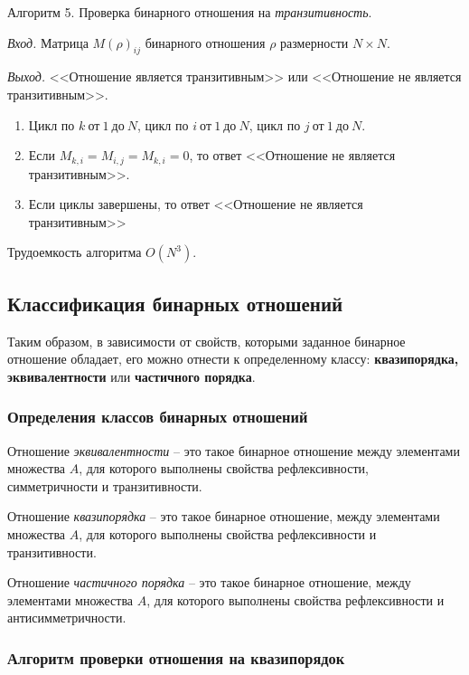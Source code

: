 \documentclass[bachelor, och, labwork]{shiza}
\begin{document}
Алгоритм 5. Проверка бинарного отношения на \textit{транзитивность}.

\textit{Вход.} Матрица $M(\rho)_{ij}$ бинарного отношения $\rho$ размерности
$N \times N$.

\textit{Выход.} <<Отношение является транзитивным>> или <<Отношение не является
транзитивным>>.

\begin{enumerate}
    
    \item Цикл по $k ~\text{от}~ 1 ~\text{до}~ N$, 
    цикл по $i ~\text{от}~ 1 ~\text{до}~ N$, цикл по $j ~\text{от}~ 1 ~\text{до}~ N$.
    
    \item Если $M_{k,i}=M_{i,j}=M_{k,i}=0$, то ответ <<Отношение не является
    транзитивным>>.
   
    \item Если циклы завершены, то ответ <<Отношение не является транзитивным>>

\end{enumerate}
Трудоемкость алгоритма $O(N^3)$.

\subsection{Классификация бинарных отношений}

Таким образом, в зависимости от свойств, которыми заданное бинарное отношение
обладает, его можно отнести к определенному классу: \textbf{квазипорядка,
эквивалентности} или \textbf{частичного порядка}. 

\subsubsection{Определения классов бинарных отношений}

Отношение \textit{эквивалентности} -- это такое бинарное отношение между элементами
множества $A$, для которого выполнены свойства рефлексивности, симметричности 
и транзитивности.

Отношение \textit{квазипорядка} -- это такое бинарное отношение, между элементами
множества $A$, для которого выполнены свойства рефлексивности и транзитивности.

Отношение \textit{частичного порядка} -- это такое бинарное отношение, между
элементами множества $A$, для которого выполнены свойства рефлексивности и
антисимметричности.

\subsubsection{Алгоритм проверки отношения на квазипорядок}
\end{document}
